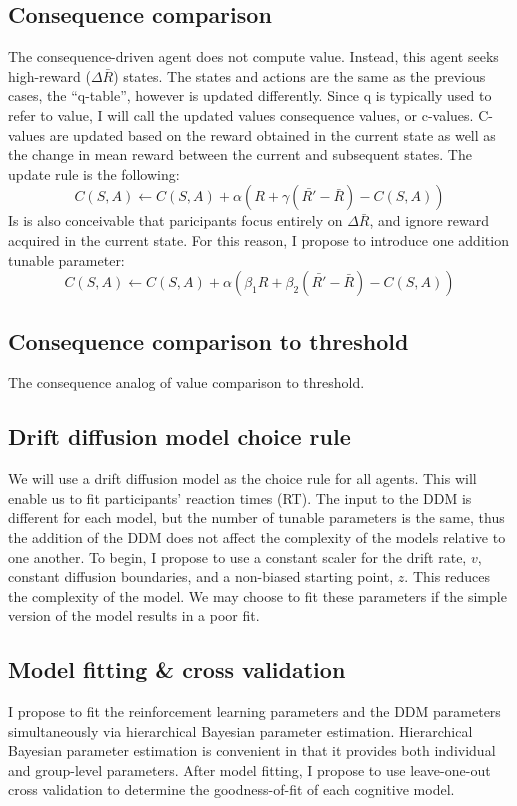 \documentclass[11pt]{article}
\begin{document}
\subsection{Consequence comparison}
\label{sec:orgf8ad6f9}
The consequence-driven agent does not compute value. Instead, this agent seeks high-reward (\(\Delta\bar{R}\)) states.
The states and actions are the same as the previous cases, the ``q-table'', however is updated differently. Since q is typically used to refer to value, I will call the updated values consequence values, or c-values. C-values are updated based on the reward obtained in the current state as well as the change in mean reward between the current and subsequent states.
The update rule is the following:
\begin{equation}
C(S, A) \gets C(S, A) + \alpha (R + \gamma (\bar{R'} - \bar{R}) - C(S, A))
\end{equation}
Is is also conceivable that paricipants focus entirely on \(\Delta\bar{R}\), and ignore reward acquired in the current state. For this reason, I propose to introduce one addition tunable parameter:
\begin{equation}
C(S, A) \gets C(S, A) + \alpha (\beta_1 R + \beta_2 (\bar{R'} - \bar{R}) - C(S, A))
\end{equation}
\subsection{Consequence comparison to threshold}
\label{sec:org0c01473}
The consequence analog of value comparison to threshold.
\subsection{Drift diffusion model choice rule}
\label{sec:orgd76db63}
We will use a drift diffusion model as the choice rule for all agents. This will enable us to fit participants' reaction times (RT). The input to the DDM is different for each model, but the number of tunable parameters is the same, thus the addition of the DDM does not affect the complexity of the models relative to one another. To begin, I propose to use a constant scaler for the drift rate, \(v\), constant diffusion boundaries, and a non-biased starting point, \(z\). This reduces the complexity of the model. We may choose to fit these parameters if the simple version of the model results in a poor fit.
\subsection{Model fitting \& cross validation}
\label{sec:org78551c8}
I propose to fit the reinforcement learning parameters and the DDM parameters simultaneously via hierarchical Bayesian parameter estimation. Hierarchical Bayesian parameter estimation is convenient in that it provides both individual and group-level parameters.
After model fitting, I propose to use leave-one-out cross validation to determine the goodness-of-fit of each cognitive model.
\end{document}
